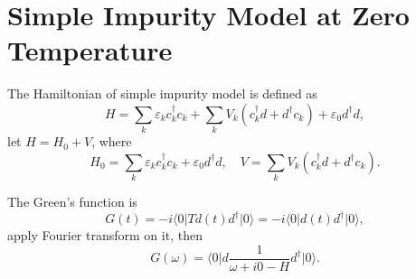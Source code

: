 \documentclass{book}
\newcommand{\bra}[1]{{\langle#1|}}
\newcommand{\ket}[1]{{|#1\rangle}}
\numberwithin{equation}{section}
\begin{document}
\section{Simple Impurity Model at Zero Temperature}
The Hamiltonian of simple impurity model is defined as
\begin{equation}
  H=\sum_k\varepsilon_kc_k^\dag c_k+\sum_kV_k(c_k^\dag d+d^\dag c_k)
  +\varepsilon_0d^\dag d,
\end{equation}
let $H=H_0+V$, where
\begin{equation}
  H_0=\sum_k\varepsilon_kc_k^\dag c_k+\varepsilon_0d^\dag d,\quad
  V=\sum_kV_k(c_k^\dag d+d^\dag c_k).
\end{equation}

The Green's function is
\begin{equation}
  G(t)=-i\bra{0}Td(t)d^\dag\ket{0}=-i\bra{0}d(t)d^\dag\ket{0},
\end{equation}
apply Fourier transform on it, then
\begin{equation}
  G(\omega)=\bra{0}d\frac{1}{\omega+i0-H}d^\dag\ket{0}.
\end{equation}
\end{document}
